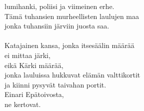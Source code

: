         lumihanki, poliisi ja viimeinen erhe. \\
        Tämä tuhansien murheellisten laulujen maa \\
        jonka tuhansiin järviin juosta saa. \\
\hspace{10mm} \\
        Katajainen kansa, jonka itsesäälin määrää \\
        ei mittaa järki, \\
        eikä Kärki määrää, \\
        jonka lauluissa hukkuvat elämän valttikortit \\
        ja kiinni pysyvät taivahan portit. \\
        Einari Epätoivosta, \\
        ne kertovat. \\
